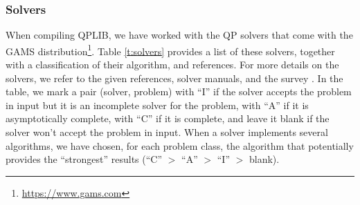\subsubsection{Solvers}\label{subsec:solver}

When compiling QPLIB, we have worked with the QP solvers that come with the GAMS distribution\footnote{\url{https://www.gams.com}}. 
Table \ref{t:solvers} provides a list of these solvers, together with a classification of their algorithm, and references.
For more details on the solvers, we refer to the given references, solver manuals, and the survey \cite{BuVi10}.
In the table, we mark a pair (solver, problem) with ``I'' if the solver accepts the problem in input but it is an incomplete solver for the problem, with ``A'' if it is asymptotically complete, with ``C'' if it is complete, and leave it blank if the solver won't accept the problem in input.
When a solver implements several algorithms, we have chosen, for each problem class, the algorithm that potentially provides the ``strongest'' results (``C'' $>$ ``A'' $>$ ``I'' $>$ blank).

